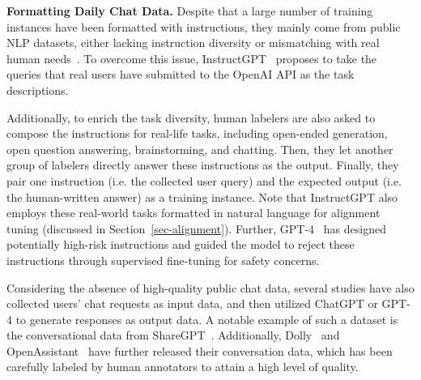 \textbf{Formatting Daily Chat Data.} Despite that a large number of training instances have been formatted with instructions, they mainly come from public NLP datasets, either lacking instruction diversity or mismatching with real human needs~\cite{Ouyang-arxiv-2022-Training}. To overcome this issue, InstructGPT~\cite{Ouyang-arxiv-2022-Training} proposes to take the queries that real users have submitted to the OpenAI API as the task descriptions.  

Additionally, to enrich the task diversity, human labelers are also asked to compose the instructions for real-life tasks, including open-ended generation, open question answering, brainstorming, and chatting. Then, they let another group of labelers directly answer these instructions as the output. Finally, they pair one instruction (i.e. the collected user query) and the expected output  (i.e. the human-written answer) as a training instance. Note that InstructGPT also employs these real-world tasks formatted in natural language for alignment tuning (discussed in Section~\ref{sec-alignment}). 
Further, GPT-4~\cite{OpenAI-OpenAI-2023-GPT-4} has designed potentially high-risk instructions and guided the model to reject these instructions through supervised fine-tuning for safety concerns. 

{Considering the absence of high-quality public chat data, several studies have also collected  users' chat requests as input data,  and then utilized ChatGPT or GPT-4 to generate responses as output data. A notable example of such a dataset is the conversational data from ShareGPT~\cite{ShareGPT}. Additionally, Dolly~\cite{Conover-2023-arxiv-Dolly} and OpenAssistant~\cite{kopf-arxiv-2023-openassistant} have further released their conversation data, which has been carefully labeled by human annotators to attain a high level of quality.}

